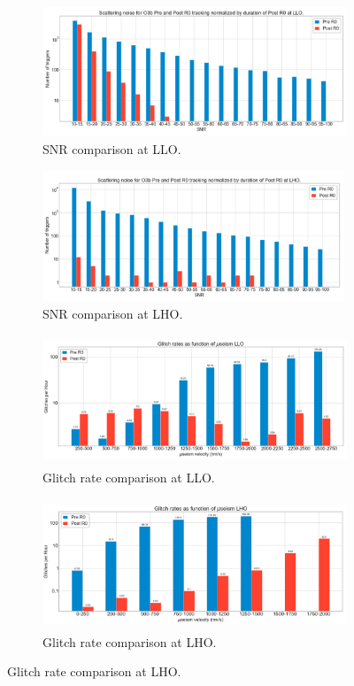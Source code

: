 \documentclass[12pt]{iopart}
\begin{document}
\begin{figure}[h]
\captionsetup[subfigure]{font=scriptsize,labelfont=scriptsize}
   \centering
    \begin{subfigure}[b]{0.45\textwidth}
        \centering
         \includegraphics[width= \textwidth,height=3.9cm]{snr_prepostLLO.png}
         \caption{SNR comparison at LLO.}
         \label{fig:snr_r0}
    \end{subfigure}
    \hfill
    \begin{subfigure}[b]{0.45\textwidth}
        \centering
         \includegraphics[width =\textwidth,height=3.9cm]{snr_prepostLHO.png}
         \caption{SNR comparison  at LHO.}
         \label{fig:rate_r0}
    \end{subfigure}
    \par\bigskip
    \begin{subfigure}[b]{0.45\textwidth}
        \centering
         \includegraphics[width= \textwidth,height=3.9cm]{glitch_rateLLO.png}
         \caption{Glitch rate comparison at LLO.}
         
         \label{fig:microL1_r0}
    \end{subfigure}
    \hfill
    \begin{subfigure}[b]{0.45\textwidth}
        \centering
         \includegraphics[width =\textwidth,height=3.9cm]{glitch_rateLHO.png}
         \caption{Glitch rate comparison at LHO.}
         \label{fig:microH1_r0}
    \end{subfigure}
    

\end{figure}
\end{document}
